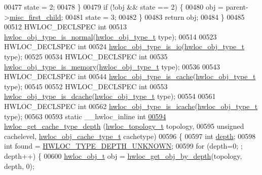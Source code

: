 \begin{DoxyCode}
00477     state = 2;
00478   \}
00479   \textcolor{keywordflow}{if} (!obj && state == 2) \{
00480     obj = parent->\hyperlink{a00238_a57812a313fe9b1a9500489f47c3011cc}{misc\_first\_child};
00481     state = 3;
00482   \}
00483   \textcolor{keywordflow}{return} obj;
00484 \}
00485 
00512 HWLOC\_DECLSPEC \textcolor{keywordtype}{int}
00513 \hyperlink{a00198_ga52ef38431eba383b048b98c669b59a16}{hwloc\_obj\_type\_is\_normal}(\hyperlink{a00184_gacd37bb612667dc437d66bfb175a8dc55}{hwloc\_obj\_type\_t} type);
00514 
00523 HWLOC\_DECLSPEC \textcolor{keywordtype}{int}
00524 \hyperlink{a00198_gac8a954ed37a4376097234c828068cbef}{hwloc\_obj\_type\_is\_io}(\hyperlink{a00184_gacd37bb612667dc437d66bfb175a8dc55}{hwloc\_obj\_type\_t} type);
00525 
00534 HWLOC\_DECLSPEC \textcolor{keywordtype}{int}
00535 \hyperlink{a00198_ga1d074390c8a3dc3088d84f73fb73f966}{hwloc\_obj\_type\_is\_memory}(\hyperlink{a00184_gacd37bb612667dc437d66bfb175a8dc55}{hwloc\_obj\_type\_t} type);
00536 
00543 HWLOC\_DECLSPEC \textcolor{keywordtype}{int}
00544 \hyperlink{a00198_ga2ed589bea28711e80b92066510a5607d}{hwloc\_obj\_type\_is\_cache}(\hyperlink{a00184_gacd37bb612667dc437d66bfb175a8dc55}{hwloc\_obj\_type\_t} type);
00545 
00552 HWLOC\_DECLSPEC \textcolor{keywordtype}{int}
00553 \hyperlink{a00198_ga395e48cd221d107e5891689624e1aec4}{hwloc\_obj\_type\_is\_dcache}(\hyperlink{a00184_gacd37bb612667dc437d66bfb175a8dc55}{hwloc\_obj\_type\_t} type);
00554 
00561 HWLOC\_DECLSPEC \textcolor{keywordtype}{int}
00562 \hyperlink{a00198_ga8abcee67b9b074332c1866405a3648a9}{hwloc\_obj\_type\_is\_icache}(\hyperlink{a00184_gacd37bb612667dc437d66bfb175a8dc55}{hwloc\_obj\_type\_t} type);
00563 
00593 \textcolor{keyword}{static} \_\_hwloc\_inline \textcolor{keywordtype}{int}
\hyperlink{a00199_gad108a09ce400222fe45545257d575489}{00594} \hyperlink{a00199_gad108a09ce400222fe45545257d575489}{hwloc\_get\_cache\_type\_depth} (\hyperlink{a00186_ga9d1e76ee15a7dee158b786c30b6a6e38}{hwloc\_topology\_t} topology,
00595                             \textcolor{keywordtype}{unsigned} cachelevel, \hyperlink{a00184_gab6e1e7efedae8b341f3ee14fbe53d66c}{hwloc\_obj\_cache\_type\_t} cachetype)
00596 \{
00597   \textcolor{keywordtype}{int} \hyperlink{a00238_a4876fd165b4fff35521f07ebd85355ed}{depth};
00598   \textcolor{keywordtype}{int} found = \hyperlink{a00187_ggaf4e663cf42bbe20756b849c6293ef575a0565ab92ab72cb0cec91e23003294aad}{HWLOC\_TYPE\_DEPTH\_UNKNOWN};
00599   \textcolor{keywordflow}{for} (depth=0; ; depth++) \{
00600     \hyperlink{a00238}{hwloc\_obj\_t} obj = \hyperlink{a00187_ga391f6b2613f0065673eaa4069b93d4e0}{hwloc\_get\_obj\_by\_depth}(topology, depth, 0);

\end{DoxyCode}
